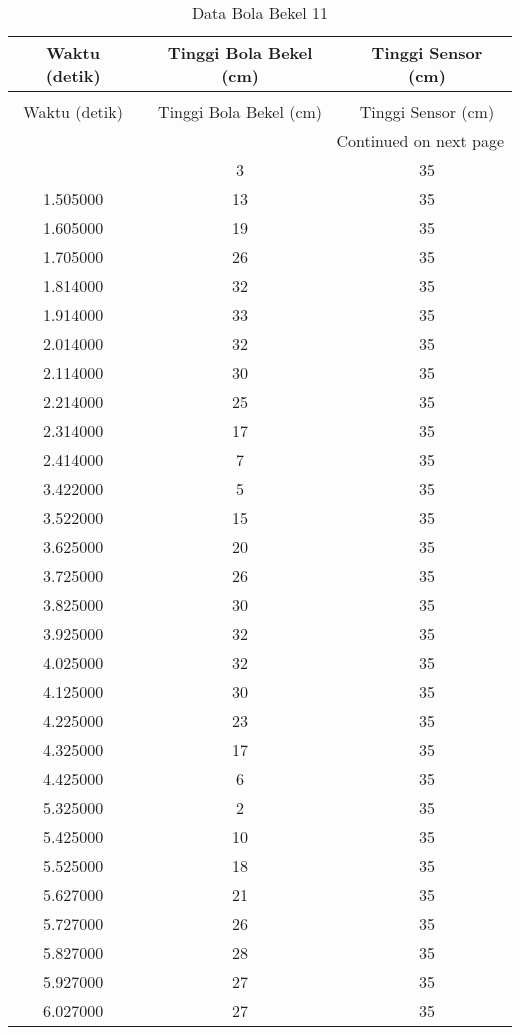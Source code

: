\begin{longtable}[htbp]{|c|c|c|}
\caption{Data Bola Bekel 11} \\
\hline
Waktu (detik) & Tinggi Bola Bekel (cm) & Tinggi Sensor (cm) \\ \hline
\endfirsthead
\caption[]{Data Bola Bekel 11} \\
\hline
Waktu (detik) & Tinggi Bola Bekel (cm) & Tinggi Sensor (cm) \\ \hline
\endhead
\multicolumn{3}{r}{Continued on next page} \\
\endfoot
\endlastfoot
1.405000 & 3 & 35 \\ \hline
1.505000 & 13 & 35 \\ \hline
1.605000 & 19 & 35 \\ \hline
1.705000 & 26 & 35 \\ \hline
1.814000 & 32 & 35 \\ \hline
1.914000 & 33 & 35 \\ \hline
2.014000 & 32 & 35 \\ \hline
2.114000 & 30 & 35 \\ \hline
2.214000 & 25 & 35 \\ \hline
2.314000 & 17 & 35 \\ \hline
2.414000 & 7 & 35 \\ \hline
3.422000 & 5 & 35 \\ \hline
3.522000 & 15 & 35 \\ \hline
3.625000 & 20 & 35 \\ \hline
3.725000 & 26 & 35 \\ \hline
3.825000 & 30 & 35 \\ \hline
3.925000 & 32 & 35 \\ \hline
4.025000 & 32 & 35 \\ \hline
4.125000 & 30 & 35 \\ \hline
4.225000 & 23 & 35 \\ \hline
4.325000 & 17 & 35 \\ \hline
4.425000 & 6 & 35 \\ \hline
5.325000 & 2 & 35 \\ \hline
5.425000 & 10 & 35 \\ \hline
5.525000 & 18 & 35 \\ \hline
5.627000 & 21 & 35 \\ \hline
5.727000 & 26 & 35 \\ \hline
5.827000 & 28 & 35 \\ \hline
5.927000 & 27 & 35 \\ \hline
6.027000 & 27 & 35 \\ \hline

\end{longtable}
